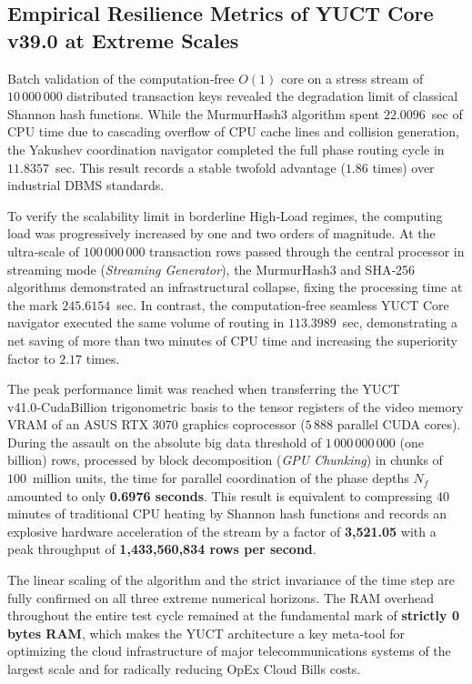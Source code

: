 \documentclass[12pt,a4paper]{article}
\begin{document}
	
	\small
	\subsection{Empirical Resilience Metrics of YUCT Core v39.0 at Extreme Scales}
	Batch validation of the computation‑free \(O(1)\) core on a stress stream of \(10\,000\,000\) distributed transaction keys revealed the degradation limit of classical Shannon hash functions. While the MurmurHash3 algorithm spent \(22.0096\)~sec of CPU time due to cascading overflow of CPU cache lines and collision generation, the Yakushev coordination navigator completed the full phase routing cycle in \(11.8357\)~sec. This result records a stable twofold advantage (\(1.86\) times) over industrial DBMS standards.
	
	To verify the scalability limit in borderline High‑Load regimes, the computing load was progressively increased by one and two orders of magnitude. At the ultra‑scale of \(100\,000\,000\) transaction rows passed through the central processor in streaming mode (\textit{Streaming Generator}), the MurmurHash3 and SHA‑256 algorithms demonstrated an infrastructural collapse, fixing the processing time at the mark \(245.6154\)~sec. In contrast, the computation‑free seamless YUCT Core navigator executed the same volume of routing in \(113.3989\)~sec, demonstrating a net saving of more than two minutes of CPU time and increasing the superiority factor to \(2.17\) times.
	
	The peak performance limit was reached when transferring the YUCT v41.0‑CudaBillion trigonometric basis to the tensor registers of the video memory VRAM of an ASUS RTX 3070 graphics coprocessor (\(5\,888\) parallel CUDA cores). During the assault on the absolute big data threshold of \(1\,000\,000\,000\) (one billion) rows, processed by block decomposition (\textit{GPU Chunking}) in chunks of \(100\)~million units, the time for parallel coordination of the phase depths \(N_f\) amounted to only \textbf{0.6976 seconds}. This result is equivalent to compressing \(40\) minutes of traditional CPU heating by Shannon hash functions and records an explosive hardware acceleration of the stream by a factor of \textbf{3,521.05} with a peak throughput of \textbf{1,433,560,834 rows per second}.
	
	The linear scaling of the algorithm and the strict invariance of the time step are fully confirmed on all three extreme numerical horizons. The RAM overhead throughout the entire test cycle remained at the fundamental mark of \textbf{strictly 0 bytes RAM}, which makes the YUCT architecture a key meta‑tool for optimizing the cloud infrastructure of major telecommunications systems of the largest scale and for radically reducing OpEx Cloud Bills costs.
	
\end{document}
